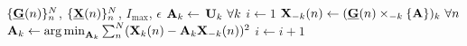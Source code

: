 \begin{algorithmic}[1]
  \Require $\{\ten{G}(n)\}_n^N$, $\{\ten{X}(n)\}_n^N$, $I_\text{max}$, $\epsilon$
  \State $\mat{A}_k \gets $ $\mat{U}_k \ \forall k$
  \State $i\gets 1$
  \Repeat
  \State $\mat{X}_{-k}(n)\gets(\ten{G}(n)\mmprsi{\mat{A}}{k})_k \ \forall n$
  \State
  $\mat{A}_k\gets\textstyle{\argmin_{\mat{A}_k}\sum_n^N}(\mat{X}_k(n)-\mat{A}_k\mat{X}_{-k}(n))^2$
  \EndFor
  \State $i\gets i+1$
\end{algorithmic}
